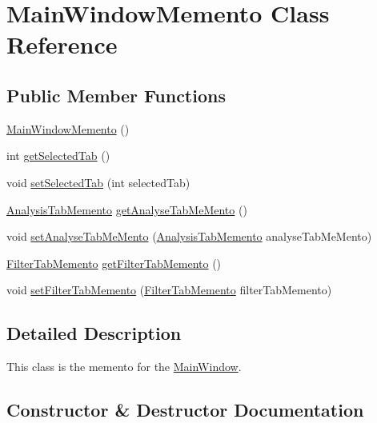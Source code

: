 \hypertarget{classMainWindowMemento}{}\section{Main\+Window\+Memento Class Reference}
\label{classMainWindowMemento}
\subsection*{Public Member Functions}
\begin{DoxyCompactItemize}
\item 
\hyperlink{classMainWindowMemento_a2ce9d23f57fc6397812a080c3111d56c}{Main\+Window\+Memento} ()
\item 
int \hyperlink{classMainWindowMemento_a876003270f9665415d49783d0669511a}{get\+Selected\+Tab} ()
\item 
void \hyperlink{classMainWindowMemento_a9ec6af835d6fdbf10eb8a6db5ad59578}{set\+Selected\+Tab} (int selected\+Tab)
\item 
\hyperlink{classAnalysisTabMemento}{Analysis\+Tab\+Memento} \hyperlink{classMainWindowMemento_adf07eb0fb1cc3a4496b7a86bd0e9de01}{get\+Analyse\+Tab\+Me\+Mento} ()
\item 
void \hyperlink{classMainWindowMemento_acbaec339f9c179b25426b37a7b8c3de8}{set\+Analyse\+Tab\+Me\+Mento} (\hyperlink{classAnalysisTabMemento}{Analysis\+Tab\+Memento} analyse\+Tab\+Me\+Mento)
\item 
\hyperlink{classFilterTabMemento}{Filter\+Tab\+Memento} \hyperlink{classMainWindowMemento_aacf25b5755797593ed00d021f9c66c58}{get\+Filter\+Tab\+Memento} ()
\item 
void \hyperlink{classMainWindowMemento_a0e0ffdcdb9e1a4b06df2a87f848541dc}{set\+Filter\+Tab\+Memento} (\hyperlink{classFilterTabMemento}{Filter\+Tab\+Memento} filter\+Tab\+Memento)
\end{DoxyCompactItemize}


\subsection{Detailed Description}
This class is the memento for the \hyperlink{classMainWindow}{Main\+Window}. 

\subsection{Constructor \& Destructor Documentation}
\hypertarget{classMainWindowMemento_a2ce9d23f57fc6397812a080c3111d56c}{}

